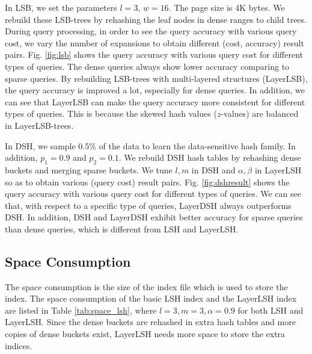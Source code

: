 
 In LSB, we set the parameters $l=3$, $w=16$. The page size is 4K bytes. We rebuild these LSB-trees by rehashing the leaf nodes in dense ranges to child trees. During query processing, in order to see the query accuracy with various query cost, we vary the number of expansions to obtain different (cost, accuracy) result pairs. Fig. \ref{fig:lsb} shows the query accuracy with various query cost for different types of queries. The dense queries always show lower accuracy comparing to sparse queries. By rebuilding LSB-trees with multi-layered structures (LayerLSB), the query accuracy is improved a lot, especially for dense queries. In addition, we can see that LayerLSB can make the query accuracy more consistent for different types of queries. This is because the skewed hash values ($z$-values) are balanced in LayerLSB-trees.


 In DSH, we sample 0.5\% of the data to learn the data-sensitive hash family. In addition, $p_1=0.9$ and $p_2=0.1$. We rebuild DSH hash tables by rehashing dense buckets and merging sparse buckets. We tune $l,m$ in DSH and $\alpha,\beta$ in LayerLSH so as to obtain various (query cost) result pairs. Fig. \ref{fig:dshresult} shows the query accuracy with various query cost for different types of queries. We can see that, with respect to a specific type of queries, LayerDSH always outperforms DSH. In addition, DSH and LayerDSH exhibit better accuracy for sparse queries than dense queries, which is different from LSH and LayerLSH.

\subsection{Space Consumption}

The space consumption is the size of the index file which is used to store the index. The space consumption of the basic LSH index and the LayerLSH index are listed in Table \ref{tab:space_lsh}, where $l=3, m=3, \alpha=0.9$ for both LSH and LayerLSH. Since the dense buckets are rehashed in extra hash tables and more copies of dense buckets exist, LayerLSH needs more space to store the extra indices.

